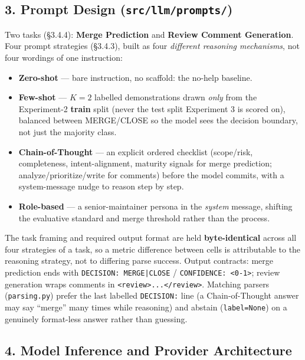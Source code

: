 \documentclass{experimentreport}
\begin{document}
{\subsection*{3. Prompt Design (\texttt{src/llm/prompts/})}

Two tasks (\S3.4.4): \textbf{Merge Prediction} and \textbf{Review Comment Generation}. Four prompt
strategies (\S3.4.3), built as four \emph{different reasoning mechanisms}, not four wordings of one
instruction:

\begin{itemize}
\item \textbf{Zero-shot} --- bare instruction, no scaffold: the no-help baseline.
\item \textbf{Few-shot} --- $K{=}2$ labelled demonstrations drawn \emph{only} from the Experiment-2
\textbf{train} split (never the test split Experiment 3 is scored on), balanced between MERGE/CLOSE
so the model sees the decision boundary, not just the majority class.
\item \textbf{Chain-of-Thought} --- an explicit ordered checklist (scope/risk, completeness,
intent-alignment, maturity signals for merge prediction; analyze/prioritize/write for comments)
before the model commits, with a system-message nudge to reason step by step.
\item \textbf{Role-based} --- a senior-maintainer persona in the \emph{system} message, shifting the
evaluative standard and merge threshold rather than the process.
\end{itemize}

The task framing and required output format are held \textbf{byte-identical} across all four
strategies of a task, so a metric difference between cells is attributable to the reasoning
strategy, not to differing parse success. Output contracts: merge prediction ends with
\texttt{DECISION: MERGE|CLOSE} / \texttt{CONFIDENCE: <0-1>}; review generation wraps comments in
\texttt{<review>...</review>}. Matching parsers (\texttt{parsing.py}) prefer the last labelled
\texttt{DECISION:} line (a Chain-of-Thought answer may say ``merge'' many times while reasoning) and
abstain (\texttt{label=None}) on a genuinely format-less answer rather than guessing.

\subsection*{4. Model Inference and Provider Architecture}

}
\end{document}
